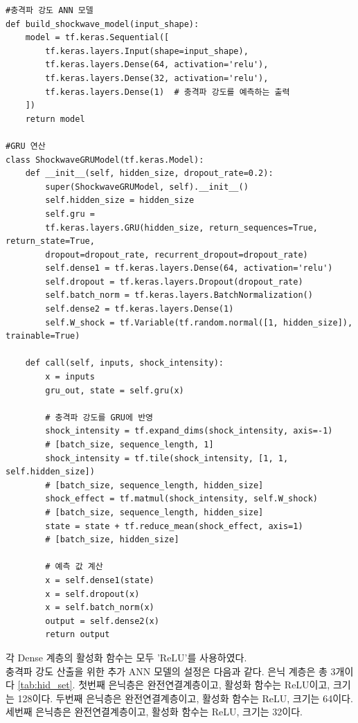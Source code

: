 \documentclass[11pt]{report}
\begin{document}
\begin{scriptsize}  %
\begin{verbatim}
#충격파 강도 ANN 모델
def build_shockwave_model(input_shape):
	model = tf.keras.Sequential([
		tf.keras.layers.Input(shape=input_shape),
		tf.keras.layers.Dense(64, activation='relu'),
		tf.keras.layers.Dense(32, activation='relu'),
		tf.keras.layers.Dense(1)  # 충격파 강도를 예측하는 출력
	])
	return model

#GRU 연산
class ShockwaveGRUModel(tf.keras.Model):
    def __init__(self, hidden_size, dropout_rate=0.2):
        super(ShockwaveGRUModel, self).__init__()
        self.hidden_size = hidden_size
        self.gru = 
		tf.keras.layers.GRU(hidden_size, return_sequences=True, return_state=True, 
		dropout=dropout_rate, recurrent_dropout=dropout_rate)
        self.dense1 = tf.keras.layers.Dense(64, activation='relu')
        self.dropout = tf.keras.layers.Dropout(dropout_rate)
        self.batch_norm = tf.keras.layers.BatchNormalization()
        self.dense2 = tf.keras.layers.Dense(1)
        self.W_shock = tf.Variable(tf.random.normal([1, hidden_size]), trainable=True)

    def call(self, inputs, shock_intensity):
        x = inputs
        gru_out, state = self.gru(x)

        # 충격파 강도를 GRU에 반영
        shock_intensity = tf.expand_dims(shock_intensity, axis=-1)  
		# [batch_size, sequence_length, 1]
        shock_intensity = tf.tile(shock_intensity, [1, 1, self.hidden_size])  
		# [batch_size, sequence_length, hidden_size]
        shock_effect = tf.matmul(shock_intensity, self.W_shock)  
		# [batch_size, sequence_length, hidden_size]
        state = state + tf.reduce_mean(shock_effect, axis=1)  
		# [batch_size, hidden_size]

        # 예측 값 계산
        x = self.dense1(state)
        x = self.dropout(x)
        x = self.batch_norm(x)
        output = self.dense2(x)
        return output
\end{verbatim}
\end{scriptsize}

각 Dense 계층의 활성화 함수는 모두 'ReLU'를 사용하였다. \\
\indent 충격파 강도 산출을 위한 추가 ANN 모델의 설정은 다음과 같다. 
은닉 계층은 총 3개이다 \autoref{tab:hid_set}. 
첫번째 은닉층은 완전연결계층이고, 활성화 함수는 ReLU이고, 크기는 128이다. 
두번째 은닉층은 완전연결계층이고, 활성화 함수는 ReLU, 크기는 64이다. 
세번째 은닉층은 완전연결계층이고, 활성화 함수는 ReLU, 크기는 32이다. 
\end{document}
